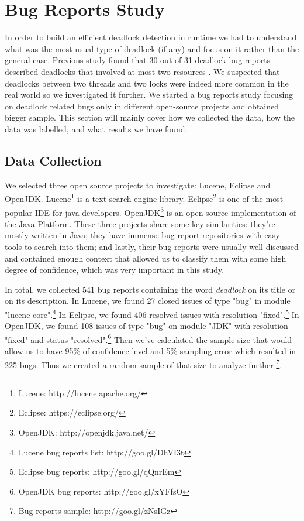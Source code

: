 \section{Bug Reports Study}

In order to build an efficient deadlock detection in runtime we had to understand what was the most usual type of deadlock (if any) and focus on it rather than the general case. Previous study found that 30 out of 31 deadlock bug reports described deadlocks that involved at most two resources \cite{lu}. We suspected that deadlocks between two threads and two locks were indeed more common in the real world so we investigated it further. We started a bug reports study focusing on deadlock related bugs only in different open-source projects and obtained bigger sample. This section will mainly cover how we collected the data, how the data was labelled, and what results we have found.

\subsection{Data Collection}

We selected three open source projects to investigate: Lucene, Eclipse and OpenJDK. Lucene\footnote{Lucene: http://lucene.apache.org/} is a text search engine library. Eclipse\footnote{Eclipse: https://eclipse.org/} is one of the most popular IDE for java developers. OpenJDK\footnote{OpenJDK: http://openjdk.java.net/} is an open-source implementation of the Java Platform. These three projects share some key similarities: they're mostly written in Java; they have immense bug report repositories with easy tools to search into them; and lastly, their bug reports were usually well discussed and contained enough context that allowed us to classify them with some high degree of confidence, which was very important in this study.

In total, we collected 541 bug reports containing the word \emph{deadlock} on its title or on its description. In Lucene, we found 27 closed issues of type "bug" in module "lucene-core".\footnote{Lucene bug reports list: http://goo.gl/DhVI3t}
In Eclipse, we found 406 resolved issues with resolution "fixed".\footnote{Eclipse bug reports: http://goo.gl/qQnrEm}
In OpenJDK, we found 108 issues of type "bug" on module "JDK" with resolution "fixed" and status "resolved".\footnote{OpenJDK bug reports: http://goo.gl/xYFfsO} Then we've calculated the sample size that would allow us to have 95\% of confidence level and 5\% sampling error which resulted in 225 bugs. Thus we created a random sample of that size to analyze further \footnote{Bug reports sample: http://goo.gl/zNsIGz}.

